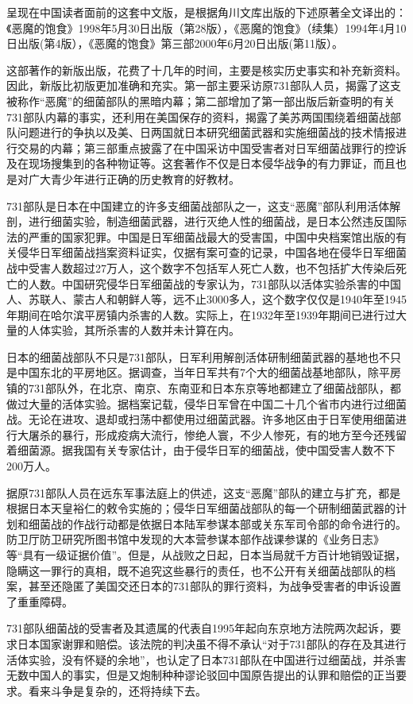 \documentclass[a4paper,12pt,UTF8,twoside]{ctexbook}
\begin{document}
呈现在中国读者面前的这套中文版，是根据角川文库出版的下述原著全文译出的：《恶魔的饱食》1998年5月30日出版（第28版），《恶魔的饱食》（续集）1994年4月10日出版(第4版），《恶魔的饱食》第三部2000年6月20日出版(第11版）。

这部著作的新版出版，花费了十几年的时间，主要是核实历史事实和补充新资料。因此，新版比初版更加准确和充实。第一部主要采访原731部队人员，揭露了这支被称作“恶魔”的细菌部队的黑暗内幕；第二部增加了第一部出版后新查明的有关731部队内幕的事实，还利用在美国保存的资料，揭露了美苏两国围绕着细菌战部队问题进行的争执以及美、日两国就日本研究细菌武器和实施细菌战的技术情报进行交易的内幕；第三部重点披露了在中国采访中国受害者对日军细菌战罪行的控诉及在现场搜集到的各种物证等。这套著作不仅是日本侵华战争的有力罪证，而且也是对广大青少年进行正确的历史教育的好教材。

731部队是日本在中国建立的许多支细菌战部队之一，这支“恶魔”部队利用活体解剖，进行细菌实验，制造细菌武器，进行灭绝人性的细菌战，是日本公然违反国际法的严重的国家犯罪。中国是日军细菌战最大的受害国，中国中央档案馆出版的有关侵华日军细菌战挡案资料证实，仅据有案可查的记录，中国各地在侵华日军细菌战中受害人数超过27万人，这个数字不包括军人死亡人数，也不包括扩大传染后死亡的人数。中国研究侵华日军细菌战的专家认为，731部队以活体实验杀害的中国人、苏联人、蒙古人和朝鲜人等，远不止3000多人，这个数字仅仅是1940年至1945年期间在哈尔滨平房镇内杀害的人数。实际上，在1932年至1939年期间已进行过大量的人体实验，其所杀害的人数并未计算在内。

日本的细菌战部队不只是731部队，日军利用解剖活体研制细菌武器的基地也不只是中国东北的平房地区。据调查，当年日军共有7个大的细菌战基地部队，除平房镇的731部队外，在北京、南京、东南亚和日本东京等地都建立了细菌战部队，都做过大量的活体实验。据档案记载，侵华日军曾在中国二十几个省市内进行过细菌战。无论在进攻、退却或扫荡中都使用过细菌武器。许多地区由于日军使用细菌进行大屠杀的暴行，形成疫病大流行，惨绝人寰，不少人惨死，有的地方至今还残留着细菌源。据我国有关专家估计，由于侵华日军的细菌战，使中国受害人数不下200万人。

据原731部队人员在远东军事法庭上的供述，这支“恶魔”部队的建立与扩充，都是根据日本天皇裕仁的敕令实施的；侵华日军细菌战部队的每一个研制细菌武器的计划和细菌战的作战行动都是依据日本陆军参谋本部或关东军司令部的命令进行的。防卫厅防卫研究所图书馆中发现的大本营参谋本部作战课参谋的《业务日志》等“具有一级证据价值”。但是，从战败之日起，日本当局就千方百计地销毁证据，隐瞒这一罪行的真相，既不追究这些暴行的责任，也不公开有关细菌战部队的档案，甚至还隐匿了美国交还日本的731部队的罪行资料，为战争受害者的申诉设置了重重障碍。

731部队细菌战的受害者及其遗属的代表自1995年起向东京地方法院两次起诉，要求日本国家谢罪和赔偿。该法院的判决虽不得不承认“对于731部队的存在及其进行活体实验，没有怀疑的余地”，也认定了日本731部队在中国进行过细菌战，并杀害无数中国人的事实，但是又炮制种种谬论驳回中国原告提出的认罪和赔偿的正当要求。看来斗争是复杂的，还将持续下去。
\end{document}
